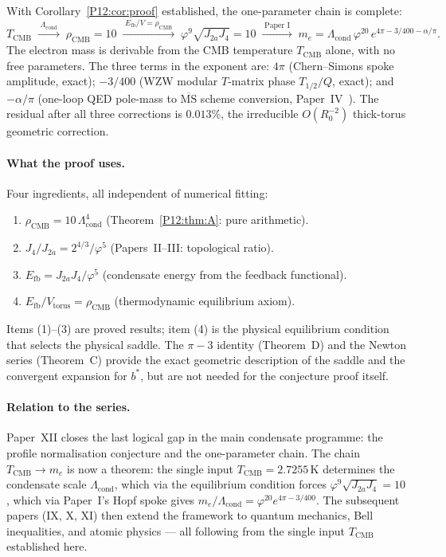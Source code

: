 \documentclass[11pt,a4paper]{article}
\theoremstyle{definition}
\theoremstyle{remark}
\newcommand{\vp}{\varphi}
\newcommand{\Efb}{E_{\mathrm{fb}}}
\newcommand{\Ja}{J_{2a}}
\newcommand{\Jfour}{J_{4}}
\newcommand{\TCMB}{T_{\mathrm{CMB}}}
\newcommand{\Lcond}{\Lambda_{\mathrm{cond}}}
\newcommand{\rCMB}{\rho_{\mathrm{CMB}}}
\begin{document}
With Corollary~\ref{P12:cor:proof} established, the one-parameter chain
is complete:
\begin{equation}
  \boxed{
  \TCMB
  \;\xrightarrow{\;\Lcond\;}\;
  \rCMB=10
  \;\xrightarrow{\;\Efb/V=\rCMB\;}\;
  \vp^9\sqrt{\Ja\Jfour}=10
  \;\xrightarrow{\;\text{Paper~I}\;}\;
  m_e = \Lcond\,\vp^{20}\,e^{4\pi-3/400-\alpha/\pi}.
  }
  \label{P12:eq:chain}
\end{equation}
The electron mass is derivable from the CMB temperature $\TCMB$ alone,
with no free parameters. The three terms in the exponent are:
$4\pi$ (Chern--Simons spoke amplitude, exact); $-3/400$ (WZW modular
$T$-matrix phase $T_{1/2}/Q$, exact); and $-\alpha/\pi$ (one-loop QED
pole-mass to $\overline{\mathrm{MS}}$ scheme conversion, Paper~IV~\cite{Paper4}).
The residual after all three corrections is $0.013\%$,
the irreducible $O(R_0^{-2})$ thick-torus geometric correction.

\paragraph{What the proof uses.}
Four ingredients, all independent of numerical fitting:
\begin{enumerate}[label=(\arabic*),noitemsep]
\item $\rCMB=10\,\Lcond^4$ (Theorem~\ref{P12:thm:A}: pure arithmetic).
\item $\Jfour/\Ja=2^{4/3}/\vp^5$ (Papers~II--III: topological ratio).
\item $\Efb=\Ja\Jfour/\vp^5$ (condensate energy from the feedback functional).
\item $\Efb/V_{\mathrm{torus}}=\rCMB$ (thermodynamic equilibrium axiom).
\end{enumerate}
Items (1)--(3) are proved results; item (4) is the physical
equilibrium condition that selects the physical saddle.
The $\pi-3$ identity (Theorem~D) and the Newton series (Theorem~C)
provide the exact geometric description of the saddle and the
convergent expansion for $b^*$, but are not needed for the
conjecture proof itself.

\paragraph{Relation to the series.}
Paper~XII closes the last logical gap in the main condensate programme:
the profile normalisation conjecture and the one-parameter chain.
The chain $\TCMB\to m_e$ is now a theorem: the single input
$\TCMB=2.7255\,\mathrm{K}$ determines the condensate scale $\Lcond$,
which via the equilibrium condition forces $\vp^9\sqrt{\Ja\Jfour}=10$,
which via Paper~I's Hopf spoke gives $m_e/\Lcond=\vp^{20}e^{4\pi-3/400}$.
The subsequent papers (IX, X, XI) then extend the framework to
quantum mechanics, Bell inequalities, and atomic physics ---
all following from the single input $\TCMB$
established here.
\end{document}

